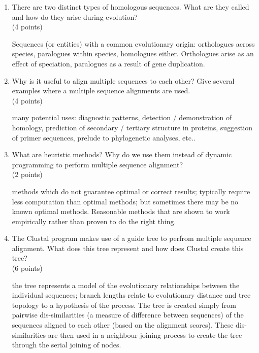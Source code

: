 \documentclass[11pt]{article}
\begin{document}
\begin{enumerate}
\item There are two distinct types of homologous sequences. What are they
  called and how do they arise during evolution?\\ 
  (4 points)

\begin{Notes}
  Sequences (or entities) with a common evolutionary origin: orthologues
  across species, paralogues within species, homologues either. Orthologues
  arise as an effect of speciation, paralogues as a result of gene
  duplication.
\end{Notes}

\item Why is it useful to align multiple sequences to each other? Give several
  examples where a multiple sequence alignments are used.\\
  (4 points)

\begin{Notes}
  many potential uses: diagnostic patterns, detection / demonstration of
  homology, prediction of secondary / tertiary structure in proteins,
  suggestion of primer sequences, prelude to phylogenetic analyses, etc.. 
\end{Notes}

\item What are heuristic methods? Why do we use them instead of dynamic
  programming to perform multiple sequence alignment?\\
  (2 points)

\begin{Notes}
  methods which do not guarantee optimal or correct results; typically require
  less computation than optimal methods; but sometimes there may be no known
  optimal methods. Reasonable methods that are shown to work empirically
  rather than proven to do the right thing.
\end{Notes}

\item The Clustal program makes use of a guide tree to perfrom multiple
  sequence alignment. What does this tree represent and how does Clustal
  create this tree?\\
  (6 points)

\begin{Notes}
  the tree represents a model of the evolutionary relationships between the
  individual sequences; branch lengths relate to evolutionary distance and
  tree topology to a hypothesis of the process. The tree is created simply
  from pairwise dis-similarities (a measure of difference between sequences)
  of the sequences aligned to each other (based on the alignment
  scores). These dis-similarities are then used in a neighbour-joining process
  to create the tree through the serial joining of nodes.
\end{Notes}


\end{enumerate}
\end{document}
